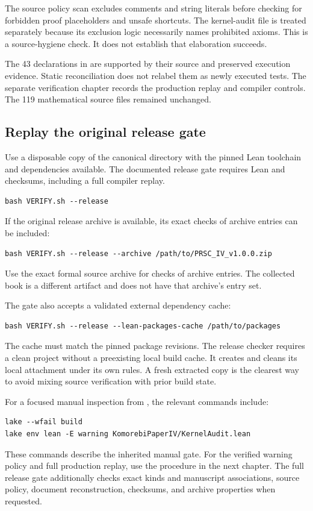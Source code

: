 The source policy scan excludes comments and string literals before checking for forbidden proof placeholders and unsafe shortcuts. The kernel-audit file is treated separately because its exclusion logic necessarily names prohibited axioms. This is a source-hygiene check. It does not establish that elaboration succeeds.

The 43 declarations in  are supported by their source and preserved execution evidence. Static reconciliation does not relabel them as newly executed tests. The separate verification chapter records the production replay and compiler controls. The 119 mathematical source files remained unchanged.

\subsection{Replay the original release gate}
Use a disposable copy of the canonical  directory with the pinned Lean toolchain and dependencies available. The documented release gate requires Lean and checksums, including a full compiler replay.
\begin{Verbatim}[fontsize=\small,breaklines=true,breakanywhere=true]
bash VERIFY.sh --release
\end{Verbatim}
If the original release archive is available, its exact checks of archive entries can be included:
\begin{Verbatim}[fontsize=\small,breaklines=true,breakanywhere=true]
bash VERIFY.sh --release --archive /path/to/PRSC_IV_v1.0.0.zip
\end{Verbatim}
Use the exact formal source archive for checks of archive entries. The collected book is a different artifact and does not have that archive's entry set.

The gate also accepts a validated external dependency cache:
\begin{Verbatim}[fontsize=\small,breaklines=true,breakanywhere=true]
bash VERIFY.sh --release --lean-packages-cache /path/to/packages
\end{Verbatim}
The cache must match the pinned package revisions. The release checker requires a clean project without a preexisting local build cache. It creates and cleans its local attachment under its own rules. A fresh extracted copy is the clearest way to avoid mixing source verification with prior build state.

For a focused manual inspection from , the relevant commands include:
\begin{Verbatim}[fontsize=\small,breaklines=true,breakanywhere=true]
lake --wfail build
lake env lean -E warning KomorebiPaperIV/KernelAudit.lean
\end{Verbatim}
These commands describe the inherited manual gate. For the verified warning policy and full production replay, use the procedure in the next chapter. The full release gate additionally checks exact kinds and manuscript associations, source policy, document reconstruction, checksums, and archive properties when requested.

